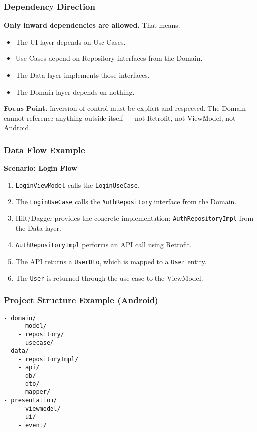\documentclass[a4paper,12pt]{article}
\begin{document}
\subsubsection{Dependency Direction}

\textbf{Only inward dependencies are allowed.} That means:

\begin{itemize}
  \item The UI layer depends on Use Cases.
  \item Use Cases depend on Repository interfaces from the Domain.
  \item The Data layer implements those interfaces.
  \item The Domain layer depends on nothing.
\end{itemize}

\textbf{Focus Point:} Inversion of control must be explicit and respected. The Domain cannot reference anything outside itself — not Retrofit, not ViewModel, not Android.

\subsubsection{Data Flow Example}

\vspace{0.5em}
\noindent\textbf{Scenario: Login Flow}
\begin{enumerate}
  \item \texttt{LoginViewModel} calls the \texttt{LoginUseCase}.
  \item The \texttt{LoginUseCase} calls the \texttt{AuthRepository} interface from the Domain.
  \item Hilt/Dagger provides the concrete implementation: \texttt{AuthRepositoryImpl} from the Data layer.
  \item \texttt{AuthRepositoryImpl} performs an API call using Retrofit.
  \item The API returns a \texttt{UserDto}, which is mapped to a \texttt{User} entity.
  \item The \texttt{User} is returned through the use case to the ViewModel.
\end{enumerate}

\subsubsection{Project Structure Example (Android)}

\begin{verbatim}
- domain/
    - model/
    - repository/
    - usecase/
- data/
    - repositoryImpl/
    - api/
    - db/
    - dto/
    - mapper/
- presentation/
    - viewmodel/
    - ui/
    - event/
\end{verbatim}
\end{document}
